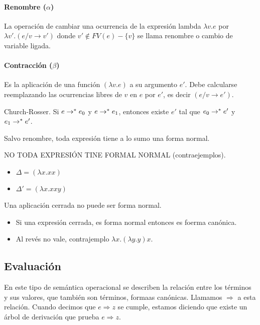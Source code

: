     \paragraph{Renombre ($\alpha$)}
      La operación de cambiar una ocurrencia de la expresión lambda
        $\lambda v.e$ por $\lambda v'.(e/v \to v')$ donde
        $v' \not\in FV(e) - \{v\}$ se llama renombre o cambio de variable
        ligada.

    \paragraph{Contracción ($\beta$)}  
      Es la aplicación de una función
        $(\lambda v.e)$ a su argumento $e'$. Debe calcularse reemplazando las
        ocurrencias libres de $v$ en $e$ por $e'$, es decir $(e/v\to e')$.
        
    \begin{theorem}{Church-Rosser.}
      Si $e \to^\ast e_0$ y $e \to^\ast e_1$, entonces existe $e'$ tal que
      $e_0 \to^\ast e'$ y $e_1 \to^\ast e'$.
    \end{theorem}
        
    \begin{corollary}
      Salvo renombre, toda expresión tiene a lo sumo una forma normal.
    \end{corollary}

    \vspace{3mm}
    \PN NO TODA EXPRESIÓN TINE FORMAL NORMAL (contraejemplos).
    \begin{itemize}
      \item $\Delta = (\lambda x.xx)$
      \item $\Delta' = (\lambda x.xxy)$
    \end{itemize}

    \begin{property}
      Una aplicación cerrada no puede ser forma normal.
    \end{property}

    \begin{itemize}
      \item Si una expresión cerrada, es forma normal entonces es foerma canónica.
      \item Al revés no vale, contrajemplo $\lambda x. (\lambda y. y) x$.
    \end{itemize}

    \subsection{Evaluación}
      \PN En este tipo de semántica operacional se describen la relación entre los términos y sus valores, que también son términos, formaas canónicas. Llamamos $\Rightarrow$ a esta relación. Cuando decimos que $e \Rightarrow z$ se cumple, estamos diciendo que existe un árbol de derivación que prueba $e \Rightarrow z$.
      
